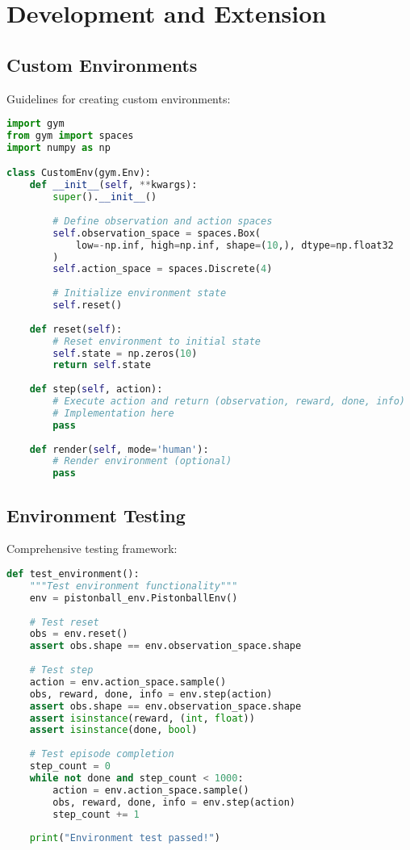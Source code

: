 \section{Development and Extension}

\subsection{Custom Environments}

Guidelines for creating custom environments:

\begin{lstlisting}[language=python, caption=Custom Environment Template]
import gym
from gym import spaces
import numpy as np

class CustomEnv(gym.Env):
    def __init__(self, **kwargs):
        super().__init__()
        
        # Define observation and action spaces
        self.observation_space = spaces.Box(
            low=-np.inf, high=np.inf, shape=(10,), dtype=np.float32
        )
        self.action_space = spaces.Discrete(4)
        
        # Initialize environment state
        self.reset()
    
    def reset(self):
        # Reset environment to initial state
        self.state = np.zeros(10)
        return self.state
    
    def step(self, action):
        # Execute action and return (observation, reward, done, info)
        # Implementation here
        pass
    
    def render(self, mode='human'):
        # Render environment (optional)
        pass
\end{lstlisting}

\subsection{Environment Testing}

Comprehensive testing framework:

\begin{lstlisting}[language=python, caption=Environment Testing]
def test_environment():
    """Test environment functionality"""
    env = pistonball_env.PistonballEnv()
    
    # Test reset
    obs = env.reset()
    assert obs.shape == env.observation_space.shape
    
    # Test step
    action = env.action_space.sample()
    obs, reward, done, info = env.step(action)
    assert obs.shape == env.observation_space.shape
    assert isinstance(reward, (int, float))
    assert isinstance(done, bool)
    
    # Test episode completion
    step_count = 0
    while not done and step_count < 1000:
        action = env.action_space.sample()
        obs, reward, done, info = env.step(action)
        step_count += 1
    
    print("Environment test passed!")
\end{lstlisting}

